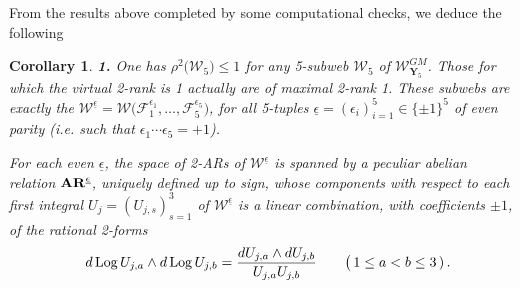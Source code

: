 \documentclass[11pt]{amsart}
\newcommand{\sk}{\smallskip}
\newtheorem{cor}[thm]{Corollary}
\begin{document}
From the results above completed by some computational checks, we deduce the following
\begin{cor}
\label{Cor:2-RA-WGM}
{\bf 1.} 
One has $\rho^2\big( \boldsymbol{\mathcal W}_5\big)\leq 1$ for any 5-subweb $\boldsymbol{\mathcal W}_5$ of $\boldsymbol{\mathcal W}_{\boldsymbol{Y}_5}^{GM}$. Those 
for which the virtual 2-rank is 1 actually are of maximal 2-rank 1. These subwebs are exactly the 
$ \boldsymbol{\mathcal W}^{\underline{\epsilon}}= 
\boldsymbol{\mathcal W}\big( \mathcal F_1^{{\epsilon}_1},\ldots, \mathcal F_5^{{\epsilon}_5}\big)$,  for all 5-tuples $\underline{\epsilon}=(\epsilon_i)_{i=1}^5 \in \{\pm 1\}^5$ of even parity (i.e. such that $\epsilon_1\cdots \epsilon_5=+1${\rm )}.

For each even $\underline{\epsilon}$, the space of 2-ARs of $ \boldsymbol{\mathcal W}^{\underline{\epsilon}}$ is spanned by a peculiar abelian relation ${\bf AR}^{\underline{\epsilon}}$, uniquely defined up to sign, whose components with respect to  each first integral $U_j=(U_{j,s})_{s=1}^3$ of $ \boldsymbol{\mathcal W}^{\underline{\epsilon}}$ is a linear combination, with coefficients $\pm 1$, of the rational 2-forms $$
{}^{} \quad d\,{\rm Log}\,U_{j,a}\wedge d\,{\rm Log}\,U_{j,b}= 
\frac{dU_{j,a}\wedge dU_{j,b}}{U_{j,a}U_{j,b}}
\qquad 
\big(\,1\leq a<b\leq 3\,)\, .
$$


\end{cor}
\end{document}
